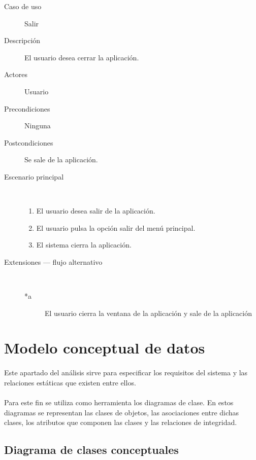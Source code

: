 \begin{description}
    \item[Caso de uso] Salir
    \item[Descripción] El usuario desea cerrar la aplicación.
    \item[Actores] Usuario
    \item[Precondiciones] Ninguna
    \item[Postcondiciones] Se sale de la aplicación.
    \item[Escenario principal] $\quad$
        \begin{enumerate}
            \item El usuario desea salir de la aplicación.
            \item El usuario pulsa la opción salir del menú principal.
            \item El sistema cierra la aplicación.
        \end{enumerate}
    \item[Extensiones --- flujo alternativo] $\quad$
        \begin{description}
            \item[*a ] El usuario cierra la ventana de la aplicación y sale de la aplicación
        \end{description}
\end{description}

\section{Modelo conceptual de datos}

\paragraph{}
Este apartado del análisis sirve para especificar los requisitos del sistema y las relaciones estáticas que
existen entre ellos.

\paragraph{}
Para este fin se utiliza como herramienta los diagramas de clase. En estos diagramas se representan
las clases de objetos, las asociaciones entre dichas clases, los atributos que componen las clases y las
relaciones de integridad.


\subsection{Diagrama de clases conceptuales}

